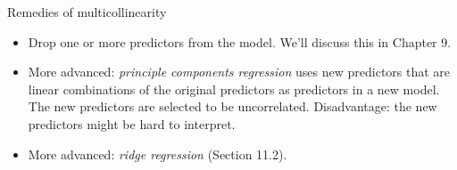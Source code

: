 \documentclass{beamer}
\begin{document}
\begin{frame}{Remedies of multicollinearity}
\begin{itemize}
\item Drop one or more predictors from the model. We'll discuss this in Chapter 9.
\item<2-> More advanced: \textit{principle components regression} uses new predictors that are linear combinations of the
original predictors as predictors in a new model. The new predictors
are selected to be uncorrelated. Disadvantage: the new predictors
might be hard to interpret.
\item<3-> More advanced: \textit{ridge regression} (Section 11.2).
\end{itemize}


\end{frame}
\end{document}
